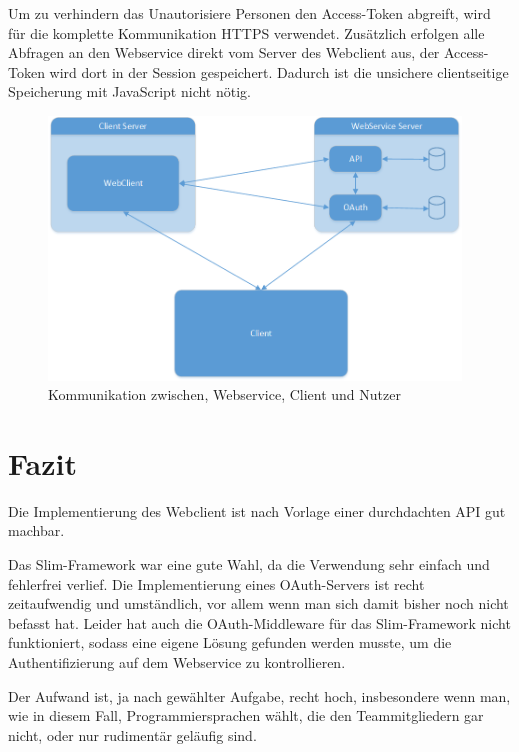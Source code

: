 Um zu verhindern das Unautorisiere Personen den Access-Token abgreift, wird für die komplette Kommunikation HTTPS verwendet. Zusätzlich erfolgen alle Abfragen an den Webservice direkt vom Server des Webclient aus, der Access-Token wird dort in der Session gespeichert. Dadurch ist die unsichere clientseitige Speicherung mit JavaScript nicht nötig.

\begin{figure}[h]
        \centering
	\includegraphics[height=70mm]{pics/Architektur.png}
	\caption{Kommunikation zwischen, Webservice, Client und Nutzer}
\end{figure}\label{oauth}


\chapter{Fazit}

Die Implementierung des Webclient ist nach Vorlage einer durchdachten API gut machbar.

Das Slim-Framework war eine gute Wahl, da die Verwendung sehr einfach und fehlerfrei verlief. Die Implementierung eines OAuth-Servers ist recht zeitaufwendig und umständlich, vor allem wenn man sich damit bisher noch nicht befasst hat. Leider hat auch die OAuth-Middleware für das Slim-Framework nicht funktioniert, sodass eine eigene Lösung gefunden werden musste, um die Authentifizierung auf dem Webservice zu kontrollieren.

Der Aufwand ist, ja nach gewählter Aufgabe, recht hoch, insbesondere wenn man, wie in diesem Fall, Programmiersprachen wählt, die den Teammitgliedern gar nicht, oder nur rudimentär geläufig sind.

